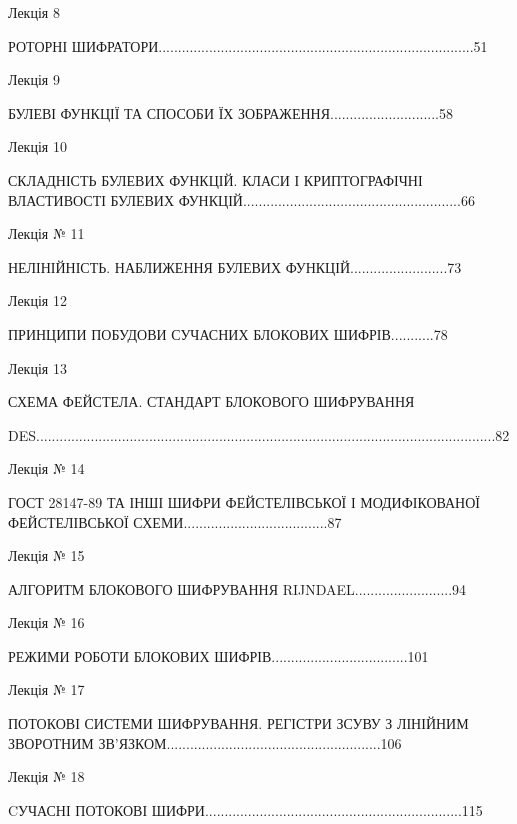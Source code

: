 \documentclass[a4paper]{article}
\newcounter{}
\begin{document}
\bigskip

Лекція 8

РОТОРНІ 
ШИФРАТОРИ.................................................................................51


\bigskip

Лекція 9

БУЛЕВІ  ФУНКЦІЇ  ТА  СПОСОБИ  ЇХ  ЗОБРАЖЕННЯ............................58 


\bigskip

Лекція 10

СКЛАДНІСТЬ  БУЛЕВИХ  ФУНКЦІЙ.  КЛАСИ  І  КРИПТОГРАФІЧНІ ВЛАСТИВОСТІ  БУЛЕВИХ 
ФУНКЦІЙ........................................................66


\bigskip

Лекція № 11

НЕЛІНІЙНІСТЬ.  НАБЛИЖЕННЯ  БУЛЕВИХ  ФУНКЦІЙ.........................73


\bigskip

Лекція 12

ПРИНЦИПИ  ПОБУДОВИ  СУЧАСНИХ  БЛОКОВИХ  ШИФРІВ...........78


\bigskip

Лекція 13

СХЕМА  ФЕЙСТЕЛА.  СТАНДАРТ  БЛОКОВОГО  ШИФРУВАННЯ  

DES......................................................................................................................82


\bigskip

Лекція № 14

ГОСТ 28147-89  ТА ІНШІ  ШИФРИ  ФЕЙСТЕЛІВСЬКОЇ  І  МОДИФІКОВАНОЇ  ФЕЙСТЕЛІВСЬКОЇ 
СХЕМИ.....................................87


\bigskip

Лекція № 15

АЛГОРИТМ  БЛОКОВОГО  ШИФРУВАННЯ  RIJNDAEL.........................94


\bigskip

Лекція № 16

РЕЖИМИ  РОБОТИ  БЛОКОВИХ  ШИФРІВ...................................101


\bigskip

Лекція № 17

ПОТОКОВІ  СИСТЕМИ  ШИФРУВАННЯ.  РЕГІСТРИ  ЗСУВУ  З ЛІНІЙНИМ  ЗВОРОТНИМ 
ЗВ’ЯЗКОМ.......................................................106

Лекція № 18

CУЧАСНІ  ПОТОКОВІ 
ШИФРИ..................................................................115
\end{document}
